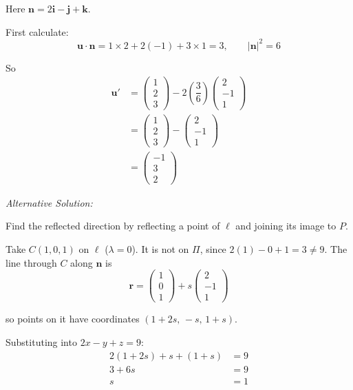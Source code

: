 \documentclass[leqno]{article}
\begin{document}
\begin{enumerate}[
  label=\textbf{\arabic*.},
  leftmargin=*,
  topsep=0pt,
  partopsep=0pt,
  parsep=0pt
]
\begin{djsSolution}
\begin{enumerate}[label=\textbf{(\alph*)}]
  Here \(\mathbf n=2\mathbf i-\mathbf j+\mathbf k\).

  First calculate:
  \[
  \mathbf u\cdot\mathbf n=1\times 2+2(-1)+3\times 1=3,
  \qquad
  |\mathbf n|^2=6
  \]

  So
  \begin{align*}
  \mathbf u'
  &=\begin{pmatrix}1\\2\\3\end{pmatrix}-2\left(\dfrac{3}{6}\right)\begin{pmatrix}2\\-1\\1\end{pmatrix}\\
  &=\begin{pmatrix}1\\2\\3\end{pmatrix}-\begin{pmatrix}2\\-1\\1\end{pmatrix}\\
  &=\begin{pmatrix}-1\\3\\2\end{pmatrix}
  \end{align*}

  {\setlength{\parskip}{8pt}%
  \textit{Alternative Solution:}

  Find the reflected direction by reflecting a point of \(\ell\) and joining its image to \(P\).

  Take \(C(1,0,1)\) on \(\ell\) (\(\lambda=0\)). It is not on \(\Pi\), since \(2(1)-0+1=3\neq 9\). The line through \(C\) along \(\mathbf n\) is
  \[
  \mathbf r=\begin{pmatrix}1\\0\\1\end{pmatrix}+s\begin{pmatrix}2\\-1\\1\end{pmatrix}
  \]

  so points on it have coordinates \((1+2s,\,-s,\,1+s)\).

  Substituting into \(2x-y+z=9\):
  \begin{align*}
  2(1+2s)+s+(1+s)&=9\\
  3+6s&=9\\
  s&=1
  \end{align*}

}
\end{enumerate}
\end{djsSolution}
\end{enumerate}
\end{document}
